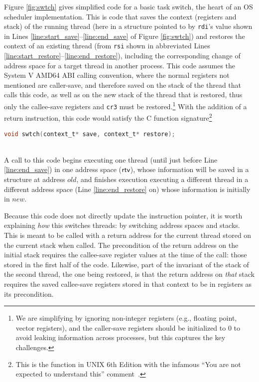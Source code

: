 Figure \ref{fig:swtch} gives simplified code for a basic task switch, the heart of an OS scheduler implementation. This is code that saves the context (registers and stack)
of the running thread (here in a structure pointed to by \lstinline|rdi|'s value shown in Lines \ref{line:start_save}--\ref{line:end_save} of Figure \ref{fig:swtch}) and restores the context of 
an existing thread (from \lstinline|rsi| shown in abbreviated Lines \ref{line:start_restore}--\ref{line:end_restore}), including the corresponding change of address space for a target thread in another process.
This code assumes the System V AMD64 ABI calling convention, where the normal registers not mentioned are caller-save, and therefore saved on the stack of the thread
that calls this code, as well as on the new stack of the thread that is restored, thus only the callee-save registers and \texttt{cr3} must be 
restored.\footnote{We are simplifying by ignoring non-integer registers (e.g., floating point, vector registers),
and the caller-save registers should be initialized to 0 to avoid leaking information across processes, but this captures the key challenges.}
With the addition of a return instruction, this code would satisfy the C function signature\footnote{This is the function in UNIX 6th Edition 
with the infamous ``You are not expected to understand this'' comment~\cite{lions1996lions}.}
\centerline{\lstinline[language=C]|void swtch(context_t* save, context_t* restore);|}\\
A call to this code begins executing one thread (until just before Line \ref{line:end_save}) in one address space ($\textsf{rtv}$), whose information will be saved in a structure at address $old$,
and finishes execution executing a different thread in a different address space (Line \ref{line:end_restore} on) whose information is initially in $new$.

Because this code does not directly update the instruction pointer, it is worth explaining \emph{how} this switches threads: by switching address spaces and stacks. 
This is meant to be called with a return address for the current thread stored on the current stack when called. 
The precondition of the return address on the initial stack requires the callee-save register values at the time of the call: those stored in the first 
half of the code.
Likewise, part of the invariant of the stack of the second thread, the one being restored, is that the return address on \emph{that} stack requires the saved 
callee-save registers stored in that context to be in registers as its precondition.

